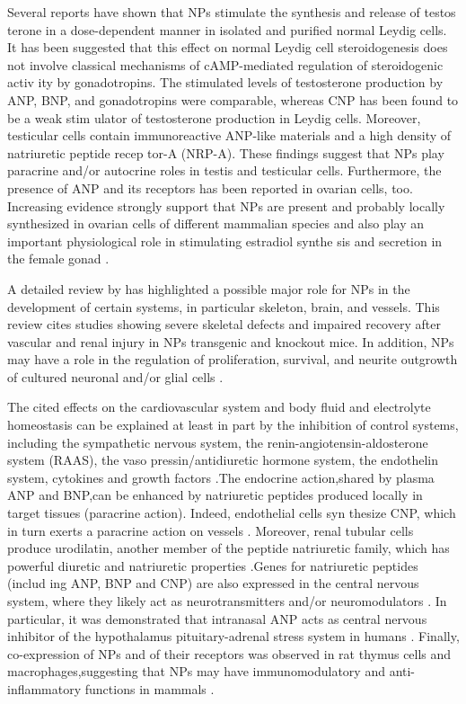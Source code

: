 \documentclass[14pt,a4paper,onecolumn]{extarticle}
\begin{document}
Several reports have shown that NPs stimulate the synthesis and release of testos terone in a dose-dependent manner in isolated and purified normal Leydig cells. It has been suggested that this effect on normal Leydig cell steroidogenesis does not involve classical mechanisms of cAMP-mediated regulation of steroidogenic activ ity by gonadotropins. The stimulated levels of testosterone production by ANP, BNP, and gonadotropins were comparable, whereas CNP has been found to be a weak stim ulator of testosterone production in Leydig cells. Moreover, testicular cells contain immunoreactive ANP-like materials and a high density of natriuretic peptide recep tor-A (NRP-A). These findings suggest that NPs play paracrine and/or autocrine roles in testis and testicular cells. Furthermore, the presence of ANP and its receptors has been reported in ovarian cells, too. Increasing evidence strongly support that NPs are present and probably locally synthesized in ovarian cells of different mammalian species and also play an important physiological role in stimulating estradiol synthe sis and secretion in the female gonad \citep{112}. %

A  detailed review by \citep{107} has highlighted a possible major role for NPs in the development of certain systems, in particular skeleton, brain, and vessels. This review cites  studies showing severe skeletal defects and impaired recovery after vascular and renal injury in NPs transgenic and knockout mice. In addition, NPs may have a role in the regulation of proliferation, survival, and neurite outgrowth of cultured neuronal and/or glial cells \citep{107}. %

The cited effects on the cardiovascular system and body fluid and electrolyte homeostasis can be explained at least in part by the inhibition of control systems, including the sympathetic nervous system, the renin-angiotensin-aldosterone system (RAAS), the vaso pressin/antidiuretic hormone system, the endothelin system, cytokines and growth factors \citep{90} \citep{96} \citep{97} \citep{98} \citep{99}.The endocrine action,shared by plasma ANP and BNP,can be enhanced by natriuretic peptides produced locally in target tissues (paracrine action). Indeed, endothelial cells syn thesize CNP, which in turn exerts a paracrine action on vessels \citep{86} \citep{87} \citep{88}. Moreover, renal tubular cells produce urodilatin, another member of the peptide natriuretic family, which has powerful diuretic and natriuretic properties \citep{100}.Genes for natriuretic peptides (includ ing ANP, BNP and CNP) are also expressed in the central nervous system, where they likely act as neurotransmitters and/or neuromodulators \citep{93} \citep{100}. In particular, it was demonstrated that intranasal ANP acts as central nervous inhibitor of the hypothalamus pituitary-adrenal stress system in humans \citep{103}. Finally, co-expression of NPs and of their receptors was observed in rat thymus cells and macrophages,suggesting that NPs may have immunomodulatory and anti-inflammatory functions in mammals \citep{106}. %
\end{document}
